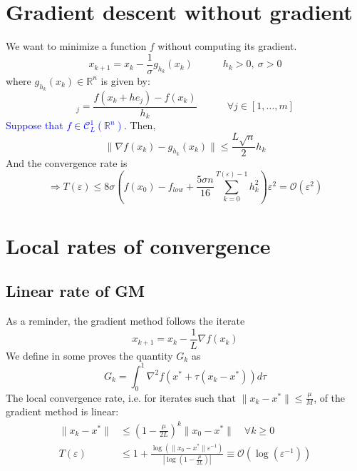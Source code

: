 \documentclass[12pt, openany]{report}
\newcommand{\R}{\mathbb{R}}
\newcommand{\C}{\mathcal{C}}
\renewcommand{\O}{\mathcal{O}}
\theoremstyle{definition}
\begin{document}
\section{Gradient descent without gradient}
We want to minimize a function $f$ without computing its gradient.
\begin{equation}
	x_{k+1} = x_k - \frac{1}{\sigma} g_{h_k}(x_k) \quad \quad \quad h_k > 0, \: \sigma > 0
\end{equation}
where $g_{h_k}(x_k) \in \R^n$ is given by:
\begin{equation}
	[g_{h_k}(x_k)]_j = \frac{f(x_k+he_j)-f(x_k)}{h_k} \quad \quad \quad \forall j\in [1,\dots,m]
\end{equation}
\textcolor{blue}{Suppose that $f\in \C^1_L(\R^n)$}. Then,
\begin{equation}
	\|\nabla f(x_k) - g_{h_k}(x_k)\| \leq \frac{L \sqrt{n}}{2} h_k
\end{equation}
And the convergence rate is 
\begin{equation}
	\Longrightarrow T(\varepsilon) \leq 8 \sigma \left( f(x_0) - f_{low} + \frac{5 \sigma n}{16} \sum_{k=0}^{T(\varepsilon)-1} h_k^2\right) \varepsilon^2 = \O(\varepsilon^2)
\end{equation}
\section{Local rates of convergence}
\subsection{Linear rate of GM}
As a reminder, the gradient method follows the iterate 
\begin{equation}
	x_{k+1} = x_k - \frac{1}{L}\nabla f(x_k)
\end{equation}
We define in some proves the quantity $G_k$ as 
\begin{equation}
	G_k = \int_0^1 \nabla^2 f(x^*+\tau(x_k-x^*))d\tau
\end{equation}
The local convergence rate, i.e. for iterates such that $\|x_k -x^*\| \leq \frac{\mu}{M}$, of the gradient method is linear:
\begin{equation}
	\begin{aligned}
		\|x_k - x^*\| &\leq \left(1-\frac{\mu}{2L}\right)^k \|x_0-x^*\| \quad \forall k \geq 0\\
		T(\varepsilon)&\leq 1+ \frac{\log \left(\|x_0 - x^*\|\varepsilon^{-1}\right)}{|\log \left(1-\frac{\mu}{2L}\right)|} \equiv \mathcal{O}(\log(\varepsilon^{-1}))
	\end{aligned}
\end{equation}
\end{document}
